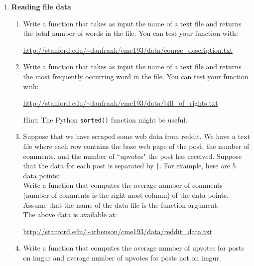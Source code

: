 \documentclass{article}
\newcounter{points}
\begin{document}
\pagestyle{fancy}
\begin{enumerate}

\item \textbf{Reading file data}
\begin{enumerate}
\item Write a function that takes as input the name of a text file and returns the total number of words in the file.  You can test your function with:
\begin{center}
\url{http://stanford.edu/~danfrank/cme193/data/course_description.txt}
\end{center}
\end{enumerate}

\begin{enumerate}
\setcounter{enumii}{1}
\item Write a function that takes as input the name of a text file and returns the most frequently occurring word in the file.  You can test your function with:
\begin{center}
\url{http://stanford.edu/~danfrank/cme193/data/bill_of_rights.txt}
\end{center}
Hint: The Python \texttt{sorted()} function might be useful. \\
\end{enumerate}

\begin{enumerate}
\setcounter{enumii}{2}
\item Suppose that we have scraped some web data from reddit.  We have a text file where each row contains the base web page of the post, the number of comments, and the number of ``upvotes" the post has received.  Suppose that the data for each post is separated by \texttt{|}.  For example, here are 5 data points: \\

Write a function that computes the average number of comments (number of comments is the right-most column) of the data points.  Assume that the name of the data file is the function argument. \\

The above data is available at:
\begin{center}
\url{http://stanford.edu/~arbenson/cme193/data/reddit_data.txt}
\end{center}

\end{enumerate}

\begin{enumerate}
\setcounter{enumii}{3}
\item Write a function that computes the average number of upvotes for posts on imgur and average number of upvotes for posts not on imgur.
\end{enumerate}


\end{enumerate}
\end{document}
